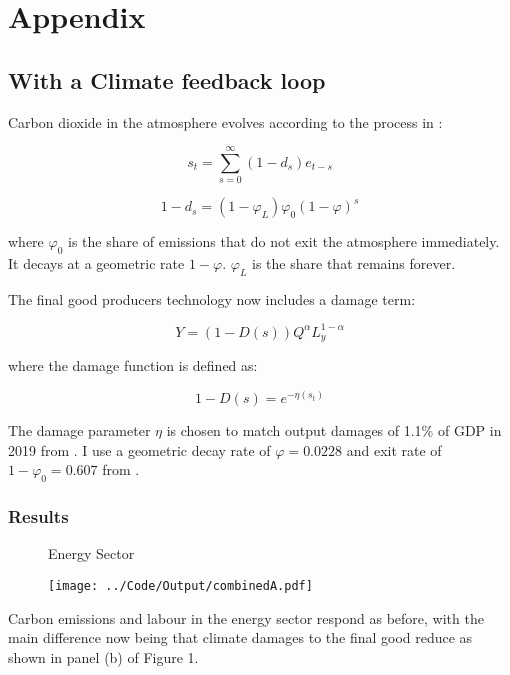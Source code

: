 \documentclass[12pt,a4paper]{article}
\begin{document}
\clearpage
\newpage






\clearpage
\appendix
\section{Appendix}

\subsection{With a Climate feedback loop}
Carbon dioxide in the atmosphere evolves according to the process in \citep{golosov2014optimal}:

\[s_{t}=\sum_{s=0}^{\infty}(1-d_{s})e_{t-s} \]

\[1-d_{s}=(1-\varphi_{L})\varphi_{0}(1-\varphi)^{s}\]

where $\varphi_{0}$ is the share of emissions that do not exit the atmosphere immediately. It decays at a geometric rate $1-\varphi$. $\varphi_{L}$ is the share that remains forever.

The final good producers technology now includes a damage term:

   \[Y=(1-D(s))Q^{\alpha}L_{y}^{1-\alpha}\]
   
 
where the damage function is defined as:

\[1-D(s)= e^{-\eta (s_{t})}\]

The damage parameter $\eta$ is chosen to match output damages of 1.1\% of GDP in 2019 from \cite{dietz2015endogenous}. I use a geometric decay rate of $\varphi=0.0228$ and exit rate of $1-\varphi_0=0.607$ from \cite{golosov2014optimal}.


   
\subsubsection{Results}
\begin{figure}[h]
    \centering
    \caption{Energy Sector}
 	\texttt{[image: ../Code/Output/combinedA.pdf]} 
 	\captionsetup{font=footnotesize}
 	\caption*{}
    
\end{figure}

Carbon emissions and labour in the energy sector respond as before, with the main difference now being that climate damages to the final good reduce as shown in panel (b) of Figure 1. 
\end{document}
